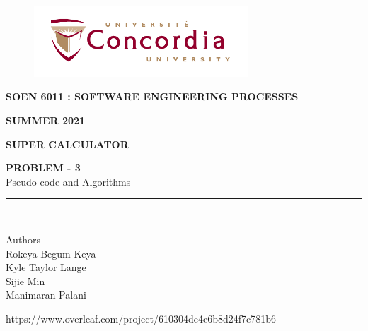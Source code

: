 \documentclass[letterpaper, 11pt]{report}
\begin{document}
\begin{titlepage}
\vspace*{0.7in}
\begin{center}
\begin{figure}[htb]
\begin{center}
\includegraphics[width=8cm]{univ_logo}
\end{center}
\end{figure}
\vspace*{0.3in}
\begin{Large}
\textbf{SOEN 6011 : SOFTWARE ENGINEERING PROCESSES} \\
\end{Large}
\vspace*{0.1in}
\begin{Large}
\textbf{SUMMER 2021} \\
\end{Large}
\vspace*{0.9in}
\begin{Large}
\textbf{SUPER CALCULATOR} \\
\end{Large}
\vspace*{0.9in}
\begin{Large} 


\textbf{PROBLEM - 3} \\
Pseudo-code and Algorithms\\
\end{Large}
\vspace*{0.625in}
\rule{80mm}{0.1mm}\\
\vspace*{0.1in}
\begin{large}
Authors \\
\vspace*{0.1in}
Rokeya Begum Keya\\
\vspace*{0.1in}
Kyle Taylor Lange\\
\vspace*{0.1in}
Sijie Min\\
\vspace*{0.1in}
Manimaran Palani\\ 
\vspace*{0.3in}
\date{\normalsize\today} 
\end{large}
\end{center}
\begin{center}
https://www.overleaf.com/project/610304de4e6b8d24f7c781b6\end{center}
\end{titlepage}
\tableofcontents
\newpage
{}
\newpage
\end{document}
